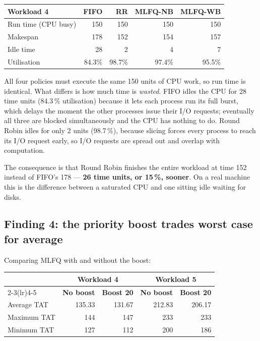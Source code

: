 \documentclass[11pt,a4paper]{article}
\begin{document}
\begin{center}\small
\begin{tabular}{lrrrr}
\toprule
\textbf{Workload 4} & \textbf{FIFO} & \textbf{RR} & \textbf{MLFQ-NB} & \textbf{MLFQ-WB}\\
\midrule
Run time (CPU busy) & 150 & 150 & 150 & 150 \\
Makespan & 178 & 152 & 154 & 157 \\
Idle time & 28 & 2 & 4 & 7 \\
Utilisation & 84.3\% & 98.7\% & 97.4\% & 95.5\% \\
\bottomrule\end{tabular}\end{center}

All four policies must execute the same 150 units of CPU work, so run time is identical.
What differs is how much time is \emph{wasted}. FIFO idles the CPU for 28 time units
(84.3\,\% utilisation) because it lets each process run its full burst, which delays the
moment the other processes issue their I/O requests; eventually all three are blocked
simultaneously and the CPU has nothing to do. Round Robin idles for only 2 units
(98.7\,\%), because slicing forces every process to reach its I/O request early, so I/O
requests are spread out and overlap with computation.

The consequence is that Round Robin finishes the entire workload at time 152 instead of
FIFO's 178 --- \textbf{26 time units, or 15\,\%, sooner}. On a real machine this is the
difference between a saturated CPU and one sitting idle waiting for disks.

\subsection{Finding 4: the priority boost trades worst case for average}

Comparing MLFQ with and without the boost:

\begin{center}\small
\begin{tabular}{lrrrr}
\toprule
& \multicolumn{2}{c}{\textbf{Workload 4}} & \multicolumn{2}{c}{\textbf{Workload 5}}\\
\cmidrule(lr){2-3}\cmidrule(lr){4-5}
& \textbf{No boost} & \textbf{Boost 20} & \textbf{No boost} & \textbf{Boost 20}\\
\midrule
Average TAT & 135.33 & 131.67 & 212.83 & 206.17 \\
Maximum TAT & 144 & 147 & 233 & 233 \\
Minimum TAT & 127 & 112 & 200 & 186 \\
\bottomrule\end{tabular}\end{center}
\end{document}
